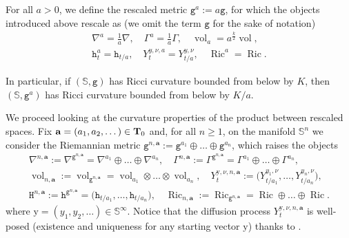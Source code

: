 \documentclass[10pt,leqno]{amsart}
\numberwithin{equation}{section}
\newcommand{\ttg}{\mathtt{g}}
\newcommand{\tth}{\mathtt{h}}
\newcommand{\ttH}{\mathtt{H}}
\newcommand{\Ss}{\mathbb{S}}
\begin{document}
For all $a>0$, we define the rescaled metric $\mathtt{g}^a := a\ttg$, for which the objects introduced above rescale as (we omit the term $\ttg$ for the sake of notation)
\begin{equation}\label{eq: rescaled quantites}
\begin{gathered}
    \nabla^{a} = \frac{1}{a}\nabla, \quad \Gamma^{a} = \frac{1}{a}\Gamma , \quad\operatorname{vol}_{a} = a^{\frac{k}{2}} \operatorname{vol},
    \\
    \tth_t^{a} = \tth_{t/a}, \quad Y_t^{y,\nu,a} = Y_{t/a}^{y,\nu} , \quad\operatorname{Ric}^{a} = \operatorname{Ric}.
\end{gathered}
\end{equation}


In particular, if $(\Ss,\ttg)$ has Ricci curvature bounded from below by $K$, then $(\Ss,\ttg^a)$ has Ricci curvature bounded from below by $K/a$.

We proceed looking at the curvature properties of the product between rescaled spaces. Fix $\mathbf{a} = (a_1,a_2,\dots) \in \bold{T}_0$ and, for all $n\geq 1$, on the manifold $\Ss^n$ we consider the Riemannian metric $\ttg^{n,\mathbf{a}} := \ttg^{a_1}\oplus \dots\oplus \ttg^{a_n}$, which raises the objects
\begin{equation}\label{eq: product}
\begin{gathered}
    \nabla^{n,\mathbf{a}}:= \nabla^{\ttg^{n,\mathbf{a}}} = \nabla^{a_1}\oplus \dots \oplus \nabla^{a_n}, \quad\Gamma^{n,\mathbf{a}}:= \Gamma^{\ttg^{n,\mathbf{a}}} = \Gamma^{a_1}\oplus \dots \oplus \Gamma^{a_n}, 
    \\
    \operatorname{vol}_{n,\mathbf{a}} := \operatorname{vol}_{\ttg^{n,\mathbf{a}}} = \operatorname{vol}_{a_1}\otimes \dots\otimes \operatorname{vol}_{a_n},\quad 
    Y_t^{\mathrm{y},\nu,n,\mathbf{a}}:= \big( Y_{t/a_1}^{y_1,\nu}, \dots, Y_{t/a_n}^{y_n,\nu} \big),
    \\
    \ttH^{n,\mathbf{a}}:= \tth^{\ttg^{n,\mathbf{a}}} = \big( \tth_{t/a_1}, \dots, \tth_{t/a_n} \big), 
    \quad
    \operatorname{Ric}_{n,\mathbf{a}} := \operatorname{Ric}_{\ttg^{n,\mathbf{a}}} = \operatorname{Ric}\oplus \dots\oplus \operatorname{Ric}.
\end{gathered}
\end{equation}
where $\mathrm{y} = (y_1,y_2,\dots)\in \Ss^{\infty}$. Notice that the diffusion process $Y_t^{\mathrm{y},\nu,n,\mathbf{a}}$ is well-posed (existence and uniqueness for any starting vector $\mathrm{y}$) thanks to \cite[Corollary 2.25]{delloschiavo2024massive}.
\end{document}
